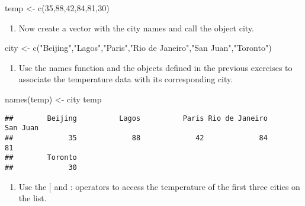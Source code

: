 \documentclass[
]{article}
\newenvironment{Shaded}{\begin{snugshade}}{\end{snugshade}}
\newcommand{\DecValTok}[1]{\textcolor[rgb]{0.00,0.00,0.81}{#1}}
\newcommand{\FunctionTok}[1]{\textcolor[rgb]{0.00,0.00,0.00}{#1}}
\newcommand{\NormalTok}[1]{#1}
\newcommand{\OtherTok}[1]{\textcolor[rgb]{0.56,0.35,0.01}{#1}}
\newcommand{\StringTok}[1]{\textcolor[rgb]{0.31,0.60,0.02}{#1}}
\providecommand{\tightlist}{%
  \setlength{\itemsep}{0pt}\setlength{\parskip}{0pt}}
\begin{document}
\begin{Shaded}
\begin{Highlighting}[]
\NormalTok{temp }\OtherTok{\textless{}{-}} \FunctionTok{c}\NormalTok{(}\DecValTok{35}\NormalTok{,}\DecValTok{88}\NormalTok{,}\DecValTok{42}\NormalTok{,}\DecValTok{84}\NormalTok{,}\DecValTok{81}\NormalTok{,}\DecValTok{30}\NormalTok{)}
\end{Highlighting}
\end{Shaded}

\begin{enumerate}
\def\labelenumi{\arabic{enumi}.}
\setcounter{enumi}{1}
\tightlist
\item
  Now create a vector with the city names and call the object city.
\end{enumerate}

\begin{Shaded}
\begin{Highlighting}[]
\NormalTok{city }\OtherTok{\textless{}{-}} \FunctionTok{c}\NormalTok{(}\StringTok{"Beijing"}\NormalTok{,}\StringTok{"Lagos"}\NormalTok{,}\StringTok{"Paris"}\NormalTok{,}\StringTok{"Rio de Janeiro"}\NormalTok{,}\StringTok{"San Juan"}\NormalTok{,}\StringTok{"Toronto"}\NormalTok{)}
\end{Highlighting}
\end{Shaded}

\begin{enumerate}
\def\labelenumi{\arabic{enumi}.}
\setcounter{enumi}{2}
\tightlist
\item
  Use the names function and the objects defined in the previous
  exercises to associate the temperature data with its corresponding
  city.
\end{enumerate}

\begin{Shaded}
\begin{Highlighting}[]
\FunctionTok{names}\NormalTok{(temp) }\OtherTok{\textless{}{-}}\NormalTok{ city}
\NormalTok{temp}
\end{Highlighting}
\end{Shaded}

\begin{verbatim}
##        Beijing          Lagos          Paris Rio de Janeiro       San Juan 
##             35             88             42             84             81 
##        Toronto 
##             30
\end{verbatim}

\begin{enumerate}
\def\labelenumi{\arabic{enumi}.}
\setcounter{enumi}{3}
\tightlist
\item
  Use the {[} and : operators to access the temperature of the first
  three cities on the list.
\end{enumerate}
\end{document}
